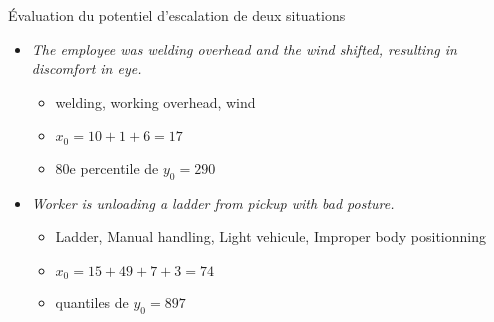 \begin{frame}
	Évaluation du potentiel d'escalation de deux situations
	
	\begin{itemize}
	
	\item \textit{The employee was welding overhead and the wind shifted, resulting in discomfort in eye.}
		\begin{itemize}
			\item welding, working overhead, wind
			\item $x_0 = 10+1+6 = 17$
			\item 80e percentile de $y_0 = 290$
			
		\end{itemize}	
	\end{itemize}
	
	
	\begin{itemize}
	\item \textit{Worker is unloading a ladder from pickup with bad posture.}\\
	\begin{itemize}
		\item Ladder, Manual handling, Light vehicule, Improper body positionning
			\item $x_0 = 15 + 49 + 7 + 3 = 74  $
			\item quantiles de $y_0 = 897$
		\end{itemize}	
	\end{itemize}

	
\end{frame}


